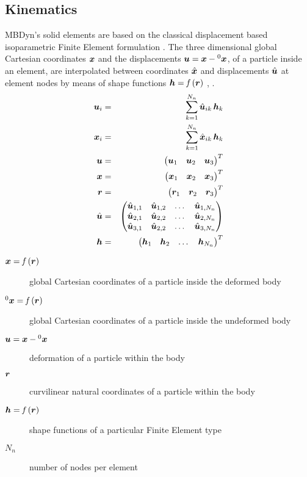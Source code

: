 \subsection{Kinematics}
\label{sec:solid:interpol}
MBDyn's solid elements are based on the classical displacement based isoparametric Finite Element formulation \cite{BATHE2016}.
The three dimensional global Cartesian coordinates $\bm{x}$ and the displacements $\bm{u}=\bm{x} - {^0}\bm{x}$, of a particle inside an element,
are interpolated between coordinates $\hat{\bm{x}}$ and displacements $\hat{\bm{u}}$ at element nodes by means of shape functions $\bm{h}=\mathit{f}\left(\bm{r}\right)$ \cite{BATHE2016}, \cite{KUEBLER2005}.
\begin{eqnarray}
  \bm{u}_{i} &=& \sum_{k=1}^{N_n}\hat{\bm{u}}_{ik} \,\bm{h}_{k} \label{eq:solid:u:interpol} \\
  \bm{x}_{i} &=& \sum_{k=1}^{N_n}\hat{\bm{x}}_{ik} \,\bm{h}_{k} \\
  \bm{u} &=& \begin{pmatrix} \bm{u}_1 & \bm{u}_2 & \bm{u}_3 \end{pmatrix}^T \\
  \bm{x} &=& \begin{pmatrix} \bm{x}_1 & \bm{x}_2 & \bm{x}_3 \end{pmatrix}^T \\
  \bm{r} &=& \begin{pmatrix} \bm{r}_1 & \bm{r}_2 & \bm{r}_3 \end{pmatrix}^T \\
  \hat{\bm{u}} &=& \begin{pmatrix}
    \hat{\bm{u}}_{1,1} & \hat{\bm{u}}_{1,2} & \ldots{} & \hat{\bm{u}}_{1,N_n} \\
    \hat{\bm{u}}_{2,1} & \hat{\bm{u}}_{2,2} & \ldots{} & \hat{\bm{u}}_{2,N_n} \\
    \hat{\bm{u}}_{3,1} & \hat{\bm{u}}_{2,2} & \ldots{} & \hat{\bm{u}}_{3,N_n}
  \end{pmatrix} \\
  \bm{h} & = & \begin{pmatrix}
    \bm{h}_1 & \bm{h}_2 & \ldots{} & \bm{h}_{N_n}
  \end{pmatrix}^T
\end{eqnarray}

\begin{description}
\item[$\bm{x}=\mathit{f}\left(\bm{r}\right)$] global Cartesian coordinates of a particle inside the deformed body
\item[$^0\bm{x}=\mathit{f}\left(\bm{r}\right)$] global Cartesian coordinates of a particle inside the undeformed body
\item[$\bm{u}=\bm{x}-{^0}\bm{x}$] deformation of a particle within the body
\item[$\bm{r}$] curvilinear natural coordinates of a particle within the body
\item[$\bm{h}=\mathit{f}\left(\bm{r}\right)$] shape functions of a particular Finite Element type
\item[$N_n$] number of nodes per element
\end{description}

